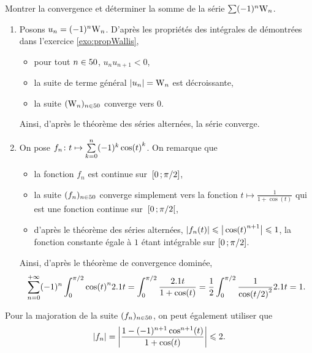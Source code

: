 
\begin{exercice}
Montrer la convergence et déterminer la somme de la série $\sum (-1)^n \Wallis_n$.
\end{exercice}

\begin{solution}
\begin{enumerate}
\item Posons $u_n = (-1)^n \Wallis_n$. D'après les propriétés des intégrales de  démontrées dans l'exercice \ref{exo:propWallis},
\begin{itemize}
\item pour tout $n \in \N$, $u_n u_{n+1} < 0$,
\item la suite de terme général $\abs{u_n} = \Wallis_n$ est décroissante,
\item la suite $(\Wallis_n)_{n \in \N}$ converge vers $0$.
\end{itemize}
Ainsi, d'après le théorème des séries alternées, la série converge.

\item On pose $\fonctionligne[f_n]{t}{\sum\limits_{k=0}^n (-1)^k \cos(t)^k}$. On remarque que
\begin{itemize}
\item la fonction $f_n$ est continue sur~$\interff{0}{\pi/2}$,
\item la suite $(f_n)_{n \in \N}$ converge simplement vers la fonction $t \mapsto \frac{1}{1 + \cos(t)}$ qui est une fonction continue sur~$\interfo{0}{\pi/2}$,
\item d'après le théorème des séries alternées, $\abs{f_n(t)} \leqslant \big|\cos(t)^{n+1}\big| \leqslant 1$, la fonction constante égale à $1$ étant intégrable sur $\interff{0}{\pi/2}$.
\end{itemize}
Ainsi, d'après le théorème de convergence dominée,
\[
\sum_{n=0}^{+\infty} (-1)^n \int_0^{\pi/2} \cos(t)^n \d t
= \int_0^{\pi/2} \frac{\d t}{1 + \cos(t)}
= \frac{1}{2} \int_0^{\pi/2} \frac{1}{\cos(t/2)^2} \d t
= 1.
\]
\end{enumerate}
\end{solution}

\begin{remarque}
Pour la majoration de la suite $(f_n)_{n \in \N}$, on peut également utiliser que
\[
\abs{f_n}
= \module{\frac{1 - (-1)^{n+1} \cos^{n+1}(t)}{1 + \cos(t)}}
\leqslant 2.
\]

\end{remarque}

